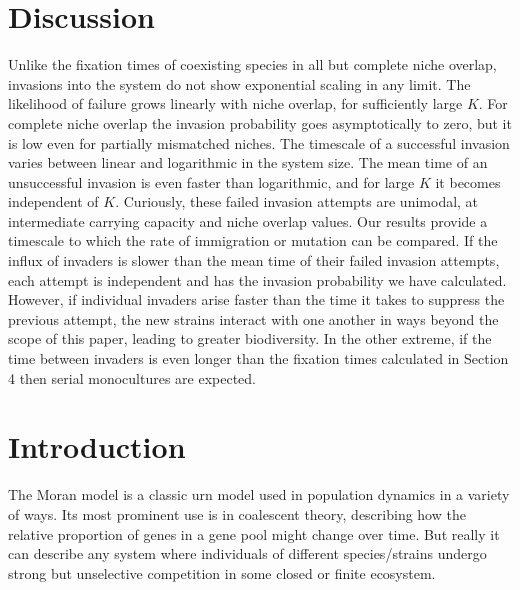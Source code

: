 \section{Discussion}
Unlike the fixation times of coexisting species in all but complete niche overlap, invasions into the system do not show exponential scaling in any limit. 
The likelihood of failure grows linearly with niche overlap, for sufficiently large $K$. 
For complete niche overlap the invasion probability goes asymptotically to zero, but it is low even for partially mismatched niches. 
The timescale of a successful invasion varies between linear and logarithmic in the system size. 
The mean time of an unsuccessful invasion is even faster than logarithmic, and for large $K$ it becomes independent of $K$. 
Curiously, these failed invasion attempts are unimodal, at intermediate carrying capacity and niche overlap values. %
Our results provide a timescale to which the rate of immigration or mutation can be compared. 
If the influx of invaders is slower than the mean time of their failed invasion attempts, each attempt is independent and has the invasion probability we have calculated. 
However, if individual invaders arise faster than the time it takes to suppress the previous attempt, the new strains interact with one another in ways beyond the scope of this paper, leading to greater biodiversity. 
In the other extreme, if the time between invaders is even longer than the fixation times calculated in Section 4 then serial monocultures are expected. 




\section{Introduction}
The Moran model \cite{Moran1962} is a classic urn model used in population dynamics in a variety of ways.
Its most prominent use is in coalescent theory, describing how the relative proportion of genes in a gene pool might change over time. 
But really it can describe any system where individuals of different species/strains undergo strong but unselective competition in some closed or finite ecosystem.


